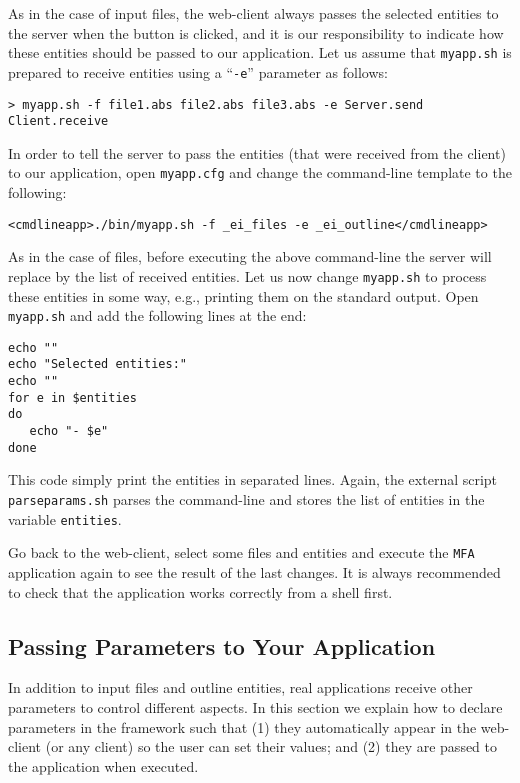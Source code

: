 As in the case of input files, the web-client always passes the
selected entities to the server when the \applybutton button is
clicked, and it is our responsibility to indicate how these entities
should be passed to our application. 
%
Let us assume that \texttt{myapp.sh} is prepared to receive entities
using a ``\texttt{-e}'' parameter as follows:

\medskip
\begin{lstlisting}
> myapp.sh -f file1.abs file2.abs file3.abs -e Server.send Client.receive
\end{lstlisting}

\medskip 
\noindent
In order to tell the server to pass the entities (that were received
from the client) to our application, open \texttt{myapp.cfg} and
change the command-line template to the following:

\medskip
\begin{lstlisting}
<cmdlineapp>./bin/myapp.sh -f _ei_files -e _ei_outline</cmdlineapp>
\end{lstlisting}

\medskip
\noindent
As in the case of files, before executing the above command-line the
server will replace  by the list of received
entities.  Let us now change \texttt{myapp.sh} to process these
entities in some way, e.g., printing them on the standard output. Open
\texttt{myapp.sh} and add the following lines at the end:

\medskip
\begin{lstlisting}[style=script]
echo ""
echo "Selected entities:"
echo ""
for e in $entities 
do
   echo "- $e"
done
\end{lstlisting}

\medskip
\noindent
This code simply print the entities in separated lines. Again, the
external script \texttt{parseparams.sh} parses the command-line and
stores the list of entities in the variable \texttt{entities}.

Go back to the web-client, select some files and entities and execute
the \texttt{MFA} application again to see the result of the last
changes. It is always recommended to check that the application works
correctly from a shell first.

\subsection{Passing Parameters to Your Application}

In addition to input files and outline entities, real applications
receive other parameters to control different aspects. In this section
we explain how to declare parameters in the \ei framework such that
(1) they automatically appear in the web-client (or any client) so the
user can set their values; and (2) they are passed to the application
when executed.

